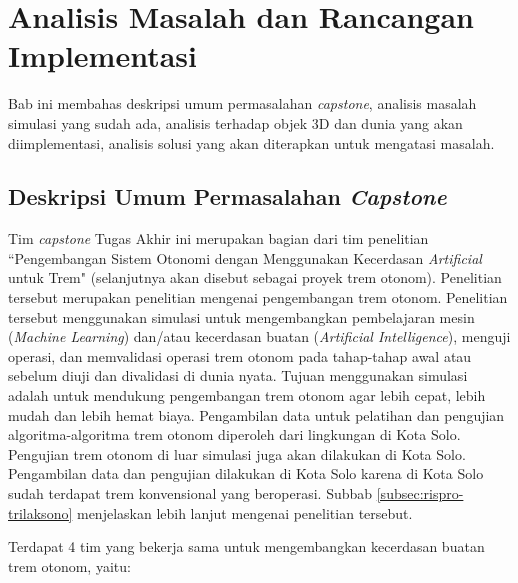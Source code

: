 \chapter{Analisis Masalah dan Rancangan Implementasi}
\label{chapter-3}

Bab ini membahas deskripsi umum permasalahan \textit{capstone}, analisis masalah
simulasi yang sudah ada, analisis terhadap objek 3D dan dunia yang akan
diimplementasi, analisis solusi yang akan diterapkan untuk mengatasi masalah.

\section{Deskripsi Umum Permasalahan \textit{Capstone}}

Tim \textit{capstone} Tugas Akhir ini merupakan bagian dari tim penelitian
``Pengembangan Sistem Otonomi dengan Menggunakan Kecerdasan \textit{Artificial}
untuk Trem" (selanjutnya akan disebut sebagai proyek trem otonom). Penelitian
tersebut merupakan penelitian mengenai pengembangan trem otonom. Penelitian
tersebut menggunakan simulasi untuk mengembangkan pembelajaran mesin
(\textit{Machine Learning}) dan/atau kecerdasan buatan (\textit{Artificial
Intelligence}), menguji operasi, dan memvalidasi operasi trem otonom pada
tahap-tahap awal atau sebelum diuji dan divalidasi di dunia nyata. Tujuan
menggunakan simulasi adalah untuk mendukung pengembangan trem otonom agar lebih
cepat, lebih mudah dan lebih hemat biaya. Pengambilan data untuk pelatihan dan
pengujian algoritma-algoritma trem otonom diperoleh dari lingkungan di Kota
Solo. Pengujian trem otonom di luar simulasi juga akan dilakukan di Kota Solo.
Pengambilan data dan pengujian dilakukan di Kota Solo karena di Kota Solo sudah
terdapat trem konvensional yang beroperasi. Subbab
\ref{subsec:rispro-trilaksono} menjelaskan lebih lanjut mengenai penelitian
tersebut.

Terdapat 4 tim yang bekerja sama untuk mengembangkan kecerdasan buatan trem
otonom, yaitu:

